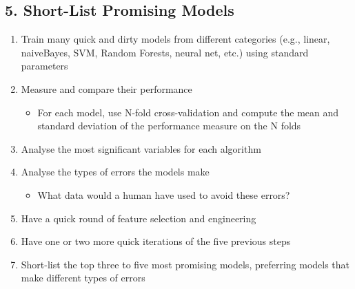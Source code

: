 \begin{slide}
  \section[-2]{5. Short-List Promising Models}

\begin{PauseHighLight}
  \begin{enumerate}\squeeze
  \item Train many quick and dirty models from different categories
    (e.g., linear, naiveBayes, SVM, Random Forests, neural net, etc.)
    using standard parameters\pause 
  \item Measure and compare their performance
    \begin{itemize}
    \item For each model, use N-fold cross-validation and compute the
      mean and standard deviation of the performance measure on the N
      folds\pause
    \end{itemize}
  \item Analyse the most significant variables for each
    algorithm\pause
  \item Analyse the types of errors the models make
    \begin{itemize}
    \item What data would a human have used to avoid these errors?\pause
    \end{itemize}
  \item Have a quick round of feature selection and engineering\pause
  \item Have one or two more quick iterations of the five previous
    steps\pause
  \item Short-list the top three to five most promising models,
    preferring models that make different types of errors\pause
  \end{enumerate}
\end{PauseHighLight}


\end{slide}


